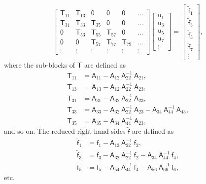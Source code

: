 \documentclass[11pt]{amsart}
\newcommand{\vct}[1]{\bm{\mathsf{#1}}}
\newcommand{\mtx}[1]{\bm{\mathsf{#1}}}
\begin{document}
\begin{equation}
\label{eq:dell3}
\begin{bmatrix}
\mtx T_{11} & \mtx T_{13} & \mtx 0 & \mtx 0 & \mtx 0 & \dots \\
\mtx T_{31} & \mtx T_{33} & \mtx T_{35} & \mtx 0 &  \mtx 0 & \dots \\
\mtx 0 & \mtx T_{53} & \mtx T_{55} & \mtx T_{57} &   \mtx 0 & \dots\\
\mtx{0} & \mtx 0 & \mtx T_{57} & \mtx T_{77} & \mtx T_{79} & \dots\\
\vdots & \vdots & \vdots & \vdots & \vdots & \vdots
\end{bmatrix}
\begin{bmatrix} \mtx u_1\\\mtx u_3\\ \mtx u_5 \\ \mtx u_7 \\ \vdots \end{bmatrix} =
\begin{bmatrix} \tilde{\vct{f}}_{1} \\ \tilde{\vct{f}}_{3} \\\tilde{\vct{f}}_{5} \\ \tilde{\mtx f}_7\\ \vdots \end{bmatrix},
\end{equation}
where the sub-blocks of $\mtx T$ are defined as
\begin{align}
\label{eq:T11}
\mtx{T}_{11} &= \mtx A_{11} - \mtx{A}_{ 12}\ \mtx{A}_{ 22}^{-1}\ \mtx{A}_{ 21}, \\
\label{eq:T13}
\mtx{T}_{13} &= \mtx A_{13} - \mtx{A}_{ 12}\ \mtx{A}_{ 22}^{-1}\ \mtx{A}_{ 23}, \\
\label{eq:T31}
\mtx{T}_{31} &= \mtx A_{31} - \mtx{A}_{ 32}\ \mtx{A}_{ 22}^{-1}\ \mtx{A}_{ 23}, \\
\label{eq:T33}
\mtx{T}_{33} &= \mtx A_{33} - \mtx{A}_{ 32}\ \mtx{A}_{ 22}^{-1}\ \mtx{A}_{ 23}
                              - \mtx{A}_{ 34}\ \mtx{A}_{ 44}^{-1}\ \mtx{A}_{ 43}, \\
\label{eq:T35}
\mtx{T}_{35} &= \mtx A_{35} - \mtx{A}_{ 34}\ \mtx{A}_{ 44}^{-1}\ \mtx{A}_{ 23},
\end{align}
and so on. The reduced right-hand sides $\mtx{\tilde f}$ are defined as
\begin{align}
\label{eq:f1}
\mtx{\tilde f}_{ 1} &= \mtx f_{ 1} - \mtx{A}_{ 12}\ \mtx{A}_{22}^{-1}\ \mtx f_2, \\
\label{eq:f3}
\mtx{\tilde f}_{ 3} &= \mtx f_{ 3} - \mtx{A}_{ 32}\ \mtx{A}_{22}^{-1}\ \mtx f_2 
                                   - \mtx{A}_{ 34}\ \mtx{A}_{44}^{-1}\ \mtx f_4, \\
\label{eq:f5}
\mtx{\tilde f}_{ 5} &= \mtx f_{ 5} - \mtx{A}_{ 54}\ \mtx{A}_{44}^{-1}\ \mtx f_4
                                   - \mtx{A}_{ 56}\ \mtx{A}_{66}^{-1}\ \mtx f_6,
\end{align}
etc.
\end{document}
